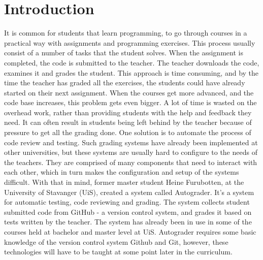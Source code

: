 \chapter*{Introduction}
It is common for students that learn programming, to go through courses in a practical way with assignments and programming exercises. This process usually consist of a number of tasks that the student solves. When the assignment is completed, the code is submitted to the teacher. The teacher downloads the code, examines it and grades the student. This approach is time consuming, and by the time the teacher has graded all the exercises, the students could have already started on their next assignment. When the courses get more advanced, and the code base increases, this problem gets even bigger. A lot of time is wasted on the overhead work, rather than providing students with the help and feedback they need. It can often result in students being left behind by the teacher because of pressure to get all the grading done. One solution is to automate the process of code review and testing. Such grading systems have already been implemented at other universities, but these systems are usually hard to configure to the needs of the teachers. They are comprised of many components that need to interact with each other, which in turn makes the configuration and setup of the systems difficult. With that in mind, former master student Heine Furubotten, at the University of Stavanger (UiS), created a system called Autograder. It's a system for automatic testing, code reviewing and grading. The system collects student submitted code from GitHub - a version control system, and grades it based on tests written by the teacher. The system has already been in use in some of the courses held at bachelor and master level at UiS. Autograder requires some basic knowledge of the version control system Github and Git, however, these technologies will have to be taught at some point later in the curriculum. 

